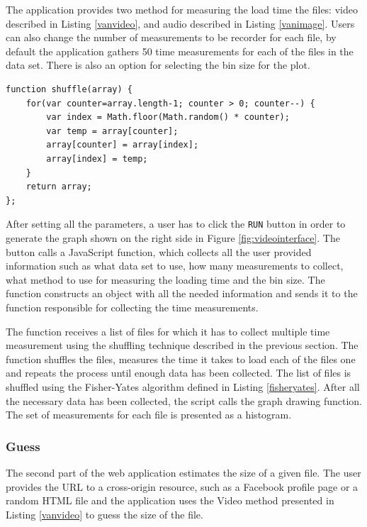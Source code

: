 \documentclass[10pt,a4paper,twoside]{book}
\begin{document}
The application provides two method for measuring the load time the files: video described in Listing \ref{vanvideo}, and audio described in Listing \ref{vanimage}. Users can also change the number of measurements to be recorder for each file, by default the application gathers 50 time measurements for each of the files in the data set. There is also an option for selecting the bin size for the plot.

\begin{lstlisting}[caption={JavaScript implementation of the Fisher-Yates algorithm},label={fisheryates}]
function shuffle(array) {
	for(var counter=array.length-1; counter > 0; counter--) {
		var index = Math.floor(Math.random() * counter);
		var temp = array[counter];
		array[counter] = array[index];
		array[index] = temp;
	}
	return array;
};
\end{lstlisting}

After setting all the parameters, a user has to click the \texttt{RUN} button in order to generate the graph shown on the right side in Figure \ref{fig:videointerface}. The button calls a JavaScript function, which collects all the user provided information such as what data set to use, how many measurements to collect, what method to use for measuring the loading time and the bin size. The function constructs an object with all the needed information and sends it to the function responsible for collecting the time measurements.

The function receives a list of files for which it has to collect multiple time measurement using the shuffling technique described in the previous section. The function shuffles the files, measures the time it takes to load each of the files one and repeats the process until enough data has been collected. The list of files is shuffled using the Fisher-Yates algorithm \cite{fisher1949statistical} defined in Listing \ref{fisheryates}. After all the necessary data has been collected, the script calls the graph drawing function. The set of measurements for each file is presented as a histogram.  

\subsubsection{Guess}

The second part of the web application estimates the size of a given file. The user provides the URL to a cross-origin resource, such as a Facebook profile page or a random HTML file and the application uses the Video method presented in Listing \ref{vanvideo} to guess the size of the file.
\end{document}
